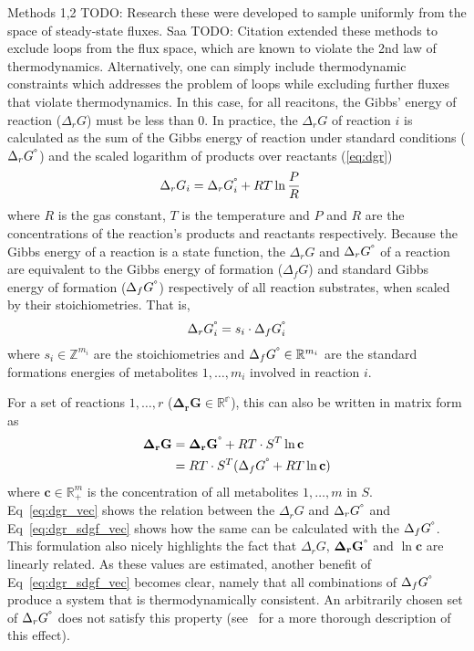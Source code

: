 \documentclass[10pt,letterpaper]{article}
\newcommand{\dgf}{\Delta_fG}
\newcommand{\sdgf}{\Delta_fG^{\degree}}
\newcommand{\dgr}{\Delta_rG}
\newcommand{\sdgr}{\Delta_rG^{\degree}}
\newcommand{\bdgr}{\mathbf{\dgr}}
\newcommand{\bsdgr}{\mathbf{\sdgr}}
\begin{document}
Methods 1,2 {TODO: Research these} were developed to sample uniformly from the space of steady-state fluxes.
Saa {TODO: Citation} extended these methods to exclude loops from the flux space, which are known to violate the 2nd law of thermodynamics.
Alternatively, one can simply include thermodynamic constraints which addresses the problem of loops while excluding further fluxes that violate thermodynamics.
In this case, for all reacitons, the Gibbs' energy of reaction ($\dgr$) must be less than 0.
In practice, the $\dgr$ of reaction $i$ is calculated as the sum of the Gibbs energy of reaction under standard conditions ($\sdgr$) and the scaled logarithm of products over reactants (\ref{eq:dgr})
\begin{align}
    \dgr_i &= \sdgr_i + RT\ln \frac{P}{R} \label{eq:dgr}
\end{align}
where $R$ is the gas constant, $T$ is the temperature and $P$ and $R$ are the concentrations of the reaction's products and reactants respectively.
Because the Gibbs energy of a reaction is a state function, the $\dgr$ and $\sdgr$ of a reaction are equivalent to the Gibbs energy of formation ($\dgf$) and standard Gibbs energy of formation ($\sdgf$) respectively of all reaction substrates, when scaled by their stoichiometries.
That is,
\[
    \sdgr_i = s_i \cdot \sdgf_i
\]
where $s_i \in \mathbb{Z}^{m_i}$ are the stoichiometries and $\sdgf \in \mathbb{R}^{m_i}$ are the standard formations energies of metabolites $1,\dots,m_i$ involved in reaction $i$.

For a set of reactions $1,\dots,r$ ($\bdgr \in \mathbb{R^r}$), this can also be written in matrix form as
\begin{align}
        \bdgr &= \bsdgr + RT \cdot S^{T}\ln{\mathbf{c}} \label{eq:dgr_vec}\\
              &= RT \cdot S^T (\sdgf + RT \ln{\mathbf{c}}) \label{eq:dgr_sdgf_vec}
\end{align}
where $\mathbf{c} \in \mathbb{R}_{+}^m$ is the concentration of all metabolites $1,\dots,m$ in $S$.
Eq~\ref{eq:dgr_vec} shows the relation between the $\dgr$ and $\sdgr$ and Eq~\ref{eq:dgr_sdgf_vec} shows how the same can be calculated with the $\sdgf$.
This formulation also nicely highlights the fact that $\dgr$, $\bsdgr$ and $\ln{\mathbf{c}}$ are linearly related.
As these values are estimated, another benefit of Eq~\ref{eq:dgr_sdgf_vec} becomes clear, namely that all combinations of $\sdgf$ produce a system that is thermodynamically consistent.
An arbitrarily chosen set of $\sdgr$ does not satisfy this property (see~\cite{noor_2013_equilibrator} for a more thorough description of this effect).
\end{document}
